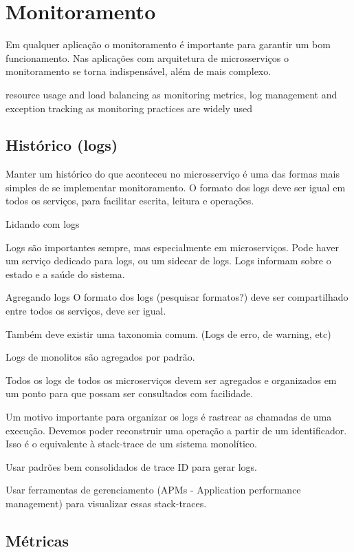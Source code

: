\section{Monitoramento}

Em qualquer aplicação o monitoramento é importante para garantir um bom funcionamento. Nas aplicações com arquitetura de microsserviços o monitoramento se torna indispensável, além de mais complexo. %

resource usage and load balancing as monitoring metrics, log management and exception tracking as monitoring practices are widely used \cite{design-monitoring-testing-waseem}

\subsection{Histórico (logs)}

Manter um histórico do que aconteceu no microsserviço é uma das formas mais simples de se implementar monitoramento. O formato dos logs deve ser igual em todos os serviços, para facilitar escrita, leitura e operações.

Lidando com logs

Logs são importantes sempre, mas especialmente em microserviços. Pode haver um serviço dedicado para logs, ou um sidecar de logs. Logs informam sobre o estado e a saúde do sistema.

Agregando logs
O formato dos logs (pesquisar formatos?) deve ser compartilhado entre todos os serviços, deve ser igual.

Também deve existir uma taxonomia comum. (Logs de erro, de warning, etc)

Logs de monolitos são agregados por padrão. 

Todos os logs de todos os microserviços devem ser agregados e organizados em um ponto para que possam ser consultados com facilidade.

Um motivo importante para organizar os logs é rastrear as chamadas de uma execução. Devemos poder reconstruir uma operação a partir de um identificador. Isso é o equivalente à stack-trace de um sistema monolítico.

Usar padrões bem consolidados de trace ID para gerar logs.

Usar ferramentas de gerenciamento (APMs - Application performance management) para visualizar essas stack-traces.

\subsection{Métricas}

